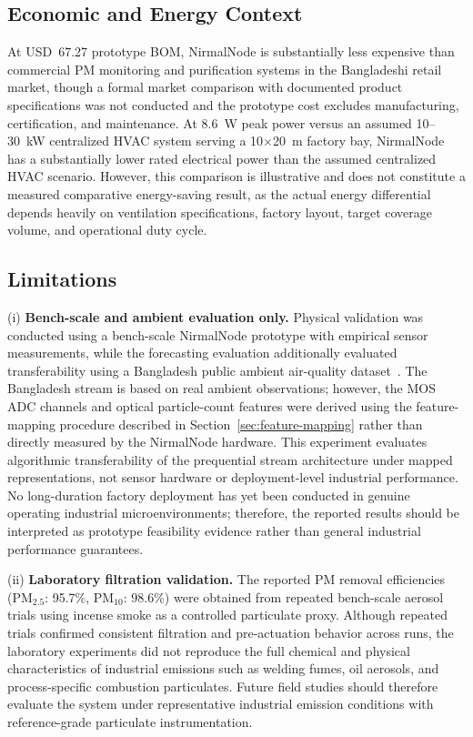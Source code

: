 \documentclass[12pt,a4paper]{article}
\begin{document}
\subsection{Economic and Energy Context}
At USD~67.27 prototype BOM, NirmalNode is substantially less expensive than commercial
PM monitoring and purification systems in the Bangladeshi retail market, though a formal
market comparison with documented product specifications was not conducted and the
prototype cost excludes manufacturing, certification, and maintenance. At 8.6~W peak
power versus an assumed 10--30~kW centralized HVAC system serving a 10$\times$20~m
factory bay, NirmalNode has a substantially lower rated electrical power than the assumed
centralized HVAC scenario. However, this comparison is illustrative and does not constitute a
measured comparative energy-saving result, as the actual energy differential depends heavily
on ventilation specifications, factory layout, target coverage volume, and operational duty cycle.

\subsection{Limitations}
\label{sec:limits}

(i) \textbf{Bench-scale and ambient evaluation only.}
Physical validation was conducted using a bench-scale NirmalNode prototype with
empirical sensor measurements, while the forecasting evaluation additionally evaluated transferability using a Bangladesh
public ambient air-quality dataset~\citep{paul2026bangladesh}. The Bangladesh stream is based on real ambient observations; however, the MOS ADC channels
and optical particle-count features were derived using the feature-mapping procedure described
in Section~\ref{sec:feature-mapping} rather than directly measured by the NirmalNode hardware. This experiment evaluates algorithmic transferability of the prequential stream architecture under mapped representations, not sensor hardware or deployment-level industrial performance.
No long-duration factory deployment has yet been conducted in genuine operating industrial
microenvironments; therefore, the reported results should be interpreted as prototype feasibility
evidence rather than general industrial performance guarantees.

(ii) \textbf{Laboratory filtration validation.}
The reported PM removal efficiencies (PM$_{2.5}$: 95.7\%, PM$_{10}$: 98.6\%) were obtained
from repeated bench-scale aerosol trials using incense smoke as a controlled particulate proxy.
Although repeated trials confirmed consistent filtration and pre-actuation behavior across runs,
the laboratory experiments did not reproduce the full chemical and physical characteristics of
industrial emissions such as welding fumes, oil aerosols, and process-specific combustion particulates.
Future field studies should therefore evaluate the system under representative industrial emission
conditions with reference-grade particulate instrumentation.
\end{document}
